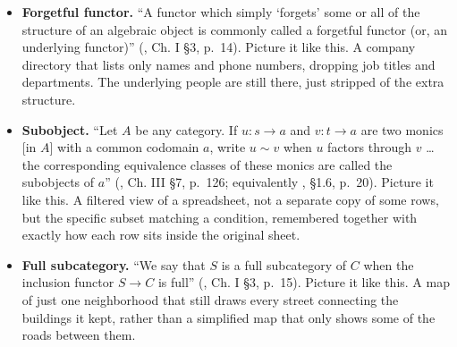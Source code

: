 \begin{itemize}
\item
  \textbf{Forgetful functor.} ``A functor which simply `forgets' some or all of the structure of an algebraic object is commonly called a forgetful functor (or, an underlying functor)'' (\cite{MacLane1998}, Ch. I §3, p.~14). Picture it like this. A company directory that lists only names and phone numbers, dropping job titles and departments. The underlying people are still there, just stripped of the extra structure.
\item
  \textbf{Subobject.} ``Let \(A\) be any category. If \(u : s \to a\) and \(v : t \to a\) are two monics {[}in \(A\){]} with a common codomain \(a\), write \(u \sim v\) when \(u\) factors through \(v\) \ldots{} the corresponding equivalence classes of these monics are called the subobjects of \(a\)'' (\cite{MacLane1998}, Ch. III §7, p.~126; equivalently \cite{Pareigis1970}, §1.6, p.~20). Picture it like this. A filtered view of a spreadsheet, not a separate copy of some rows, but the specific subset matching a condition, remembered together with exactly how each row sits inside the original sheet.
\item
  \textbf{Full subcategory.} ``We say that \(S\) is a full subcategory of \(C\) when the inclusion functor \(S \to C\) is full'' (\cite{MacLane1998}, Ch. I §3, p.~15). Picture it like this. A map of just one neighborhood that still draws every street connecting the buildings it kept, rather than a simplified map that only shows some of the roads between them.
\end{itemize}
